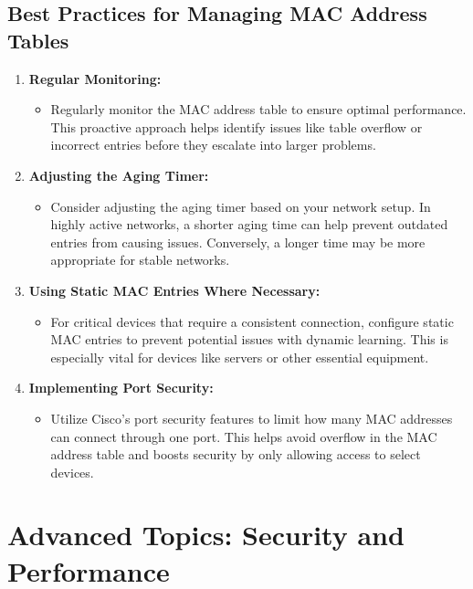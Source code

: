 \documentclass[11pt,a4paper]{article}
\begin{document}
\subsection*{Best Practices for Managing MAC Address Tables}
\begin{enumerate}
    \item \textbf{Regular Monitoring:}
        \begin{itemize}
            \item Regularly monitor the MAC address table to ensure optimal performance. This proactive approach helps identify issues like table overflow or incorrect entries before they escalate into larger problems.
        \end{itemize}

    \item \textbf{Adjusting the Aging Timer:}
        \begin{itemize}
            \item Consider adjusting the aging timer based on your network setup. In highly active networks, a shorter aging time can help prevent outdated entries from causing issues. Conversely, a longer time may be more appropriate for stable networks.
        \end{itemize}

    \item \textbf{Using Static MAC Entries Where Necessary:}
        \begin{itemize}
            \item For critical devices that require a consistent connection, configure static MAC entries to prevent potential issues with dynamic learning. This is especially vital for devices like servers or other essential equipment.
        \end{itemize}

    \item \textbf{Implementing Port Security:}
        \begin{itemize}
            \item Utilize Cisco's port security features to limit how many MAC addresses can connect through one port. This helps avoid overflow in the MAC address table and boosts security by only allowing access to select devices.
        \end{itemize}

\end{enumerate}




\section*{Advanced Topics: Security and Performance}
\end{document}
